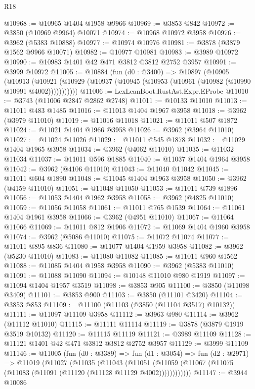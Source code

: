 \begin{lexlean}{R18}
\begin{coremodule}
@10968 := @10965 @1404 @1958 @9966
@10969 := @3853 @842
@10972 := @3850 (@10969 @9964) @10071
@10974 := @10968 @10972 @3958
@10976 := @3962 (@5383 @10888)
@10977 := @10974 @10976
@10981 := @3878 (@3879 @1562 @9966 @10071)
@10982 := @10977 @10981
@10983 := @3989 @10972
@10990 := @10983 @1401 @42 @471 @3812 @3812 @2752 @3957
@10991 := @3999 @10972
@11005 := @10884
    (fun (d0 : @3400) =>
    @10897
      (@10905
        (@10913
          (@10921 (@10929 (@10937 (@10945 (@10953 (@10961 (@10982 (@10990 @10991 @4002)))))))))))
@11006 := LexLeanBoot.RustAst.Expr.EProbe
@11010 := @3743 (@11006 @2847 @2862 @2748)
@11011 := @10133 @11010
@11013 := @11011 @483 @1485
@11016 := @11013 @1404 @1967 @3958
@11018 := @3962 (@3979 @11010)
@11019 := @11016 @11018
@11021 := @11011 @507 @1872
@11024 := @11021 @1404 @1966 @3958
@11026 := @3962 (@3964 @11010)
@11027 := @11024 @11026
@11029 := @11011 @545 @1878
@11032 := @11029 @1404 @1965 @3958
@11034 := @3962 (@4062 @11010)
@11035 := @11032 @11034
@11037 := @11011 @596 @1885
@11040 := @11037 @1404 @1964 @3958
@11042 := @3962 (@4106 @11010)
@11043 := @11040 @11042
@11045 := @11011 @604 @1890
@11048 := @11045 @1404 @1963 @3958
@11050 := @3962 (@4159 @11010)
@11051 := @11048 @11050
@11053 := @11011 @739 @1896
@11056 := @11053 @1404 @1962 @3958
@11058 := @3962 (@4825 @11010)
@11059 := @11056 @11058
@11061 := @11011 @765 @1539
@11064 := @11061 @1404 @1961 @3958
@11066 := @3962 (@4951 @11010)
@11067 := @11064 @11066
@11069 := @11011 @812 @1906
@11072 := @11069 @1404 @1960 @3958
@11074 := @3962 (@5086 @11010)
@11075 := @11072 @11074
@11077 := @11011 @895 @836
@11080 := @11077 @1404 @1959 @3958
@11082 := @3962 (@5230 @11010)
@11083 := @11080 @11082
@11085 := @11011 @960 @1562
@11088 := @11085 @1404 @1958 @3958
@11090 := @3962 (@5383 @11010)
@11091 := @11088 @11090
@11094 := @10148 @11010 @980 @1919
@11097 := @11094 @1404 @1957 @3519
@11098 := @3853 @905
@11100 := @3850 (@11098 @3409)
@11101 := @3853 @900
@11103 := @3850 (@11101 @3420)
@11104 := @3853 @853
@11109 := @11100 (@11103 (@3850 (@11104 @3517) @10132))
@11111 := @11097 @11109 @3958
@11112 := @3963 @980
@11114 := @3962 (@11112 @11010)
@11115 := @11111 @11114
@11119 := @3878 (@3879 @1919 @3519 @10132)
@11120 := @11115 @11119
@11121 := @3989 @11109
@11128 := @11121 @1401 @42 @471 @3812 @3812 @2752 @3957
@11129 := @3999 @11109
@11146 := @11005
    (fun (d0 : @3389) =>
    fun (d1 : @3054) =>
    fun (d2 : @2971) =>
    @11019
      (@11027
        (@11035
          (@11043
            (@11051 (@11059 (@11067 (@11075 (@11083 (@11091 (@11120 (@11128 @11129 @4002))))))))))))
@11147 := @3944 @10086

\end{coremodule}
\end{lexlean}

